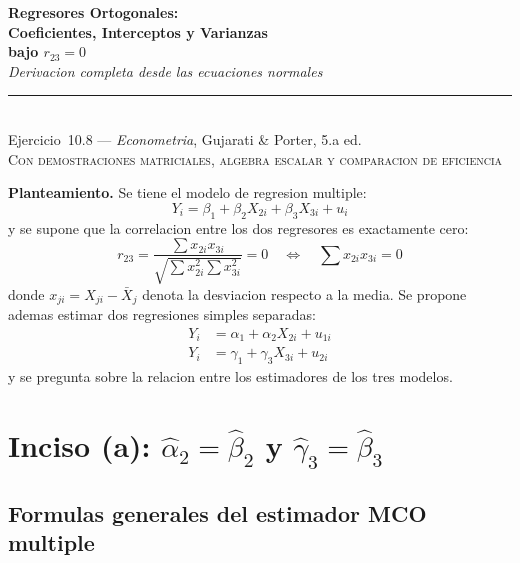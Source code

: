 \documentclass[12pt, letterpaper]{article}
\theoremstyle{remark}
\begin{document}
\begin{center}
  {\LARGE\bfseries Regresores Ortogonales:}\\[6pt]
  {\LARGE\bfseries Coeficientes, Interceptos y Varianzas}\\[6pt]
  {\LARGE\bfseries bajo $r_{23} = 0$}\\[12pt]
  {\large\itshape Derivacion completa desde las ecuaciones normales}\\[14pt]
  \rule{0.55\linewidth}{0.6pt}\\[8pt]
  {\normalsize Ejercicio~10.8 --- \textit{Econometria}, Gujarati \& Porter, 5.a ed.}\\[4pt]
  {\small\textsc{Con demostraciones matriciales, algebra escalar y comparacion de eficiencia}}
\end{center}

\vspace{10pt}

\noindent\textbf{Planteamiento.}\quad
Se tiene el modelo de regresion multiple:
\begin{equation}
  Y_i = \beta_1 + \beta_2 X_{2i} + \beta_3 X_{3i} + u_i
  \label{eq:multiple}
\end{equation}
y se supone que la correlacion entre los dos regresores es exactamente cero:
\begin{equation}
  r_{23} = \frac{\sum x_{2i} x_{3i}}{\sqrt{\sum x_{2i}^2 \sum x_{3i}^2}} = 0
  \quad \Longleftrightarrow \quad
  \sum x_{2i} x_{3i} = 0
  \label{eq:ortogonal}
\end{equation}
donde $x_{ji} = X_{ji} - \bar{X}_j$ denota la desviacion respecto a la media.
Se propone ademas estimar dos regresiones simples separadas:
\begin{align}
  Y_i &= \alpha_1 + \alpha_2 X_{2i} + u_{1i}
  \label{eq:simple1}\\
  Y_i &= \gamma_1 + \gamma_3 X_{3i} + u_{2i}
  \label{eq:simple2}
\end{align}
y se pregunta sobre la relacion entre los estimadores de los tres modelos.

\section{Inciso (a): \texorpdfstring{$\hat\alpha_2 = \hat\beta_2$}{alpha2 = beta2} y \texorpdfstring{$\hat\gamma_3 = \hat\beta_3$}{gamma3 = beta3}}

\subsection{Formulas generales del estimador MCO multiple}
\end{document}

